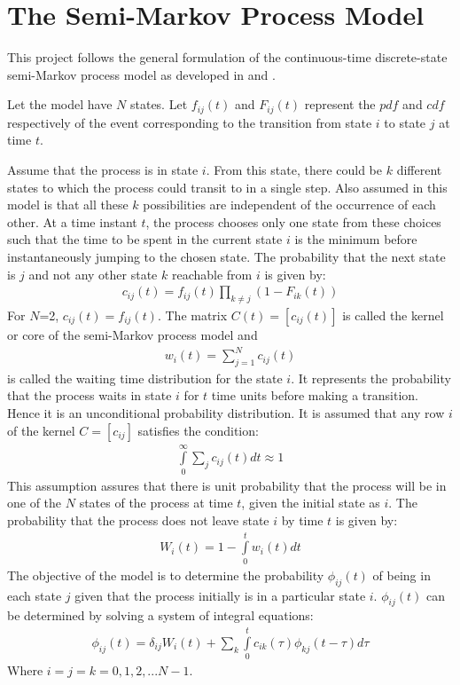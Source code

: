\section{The Semi-Markov Process Model}
\label{sec:SMPModel}
This project follows the general formulation of the continuous-time discrete-state semi-Markov process model as developed in \cite{HowardA} and \cite{HowardB}. 

Let the model have $N$ states. Let $f_{ij}(t)$ and $F_{ij}(t)$ represent the   $pdf$ and $cdf$ respectively of the event corresponding to the transition from state $i$ to state $j$ at time $t$. 

Assume that the process is in state $i$. From this state, there could be $k$ different states to which the process could transit to in a single step. Also assumed in this model is that all these $k$ possibilities are independent of the occurrence of each other. At a time instant $t$, the process chooses only one state from these choices such that the time to be spent in the current state $i$ is the minimum before instantaneously jumping to the chosen state. The probability that the next state is $j$ and not any other state $k$ reachable from $i$ is given by:
\begin{align}
\label{eq:CompRisk}
c_{ij}(t) =  f_{ij} (t)\prod\limits_{k \ne j} {(1 - F_{ik} (t))} 
\end{align}
For $N$=2, $c_{ij}(t) =  f_{ij} (t)$. The matrix $C(t)=[ c_{ij}(t) ]$ is called the kernel or core of the semi-Markov process model and
\begin{align}
\label{eq:waiting}
w_i(t) = \sum\limits_{j=1}^{N}{c_{ij}(t)}
\end{align}
is called the waiting time distribution for the state $i$. It represents the probability that the process waits in state $i$ for $t$ time units before making a transition. Hence it is an unconditional probability distribution. 
It is assumed that any row $i$ of the kernel $C=[c_{ij}]$ satisfies the condition:
\begin{eqnarray}
\int\limits_0^\infty  { \sum\limits_{j}^{}{c_{ij}(t)} dt \approx 1} 
\label{eq:MREAssumption}
\end{eqnarray}
This assumption assures that there is unit probability that the process
will be in one of the $N$ states of the process at time $t$, given the initial 
state as $i$. The probability that the process does not leave state $i$ by time $t$ is given by:
\begin{align}
\label{eq:staying}
W_i (t) = 1 - \int\limits_0^t {w_i(t)dt} 
\end{align}
The objective of the model is to determine the probability $\phi_{ij}(t)$  of being in each state  $j$ given that the process initially is in a particular state $i$. $\phi_{ij}(t)$  can be determined by solving a system of integral equations:
\begin{align}
{\phi _{ij} (t)} = \delta _{ij} W_i (t) + \sum\limits_k {\int\limits_0^t {c_{ik} (\tau ){\phi _{kj} (t - \tau )}d\tau } } 
\label{CTMRE}
\end{align}
Where $i=j=k=0,1,2,...N-1$.	 


